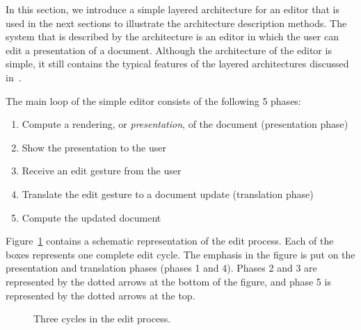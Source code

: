 In this section, we introduce a simple layered architecture for an editor that is used in the next sections to illustrate the architecture description methods. The system that is described by the architecture is an editor in which the user can edit a presentation of a document. Although the architecture of the editor is simple, it still contains the typical features of the layered architectures discussed in~\cite{architecture}. 


The main loop of the simple editor consists of the following 5 phases: 
 \begin{enumerate}
 \item Compute a rendering, or {\it presentation}, of the document   (presentation phase)
 \item Show the presentation to the user
 \item Receive an edit gesture from the user
 \item Translate the edit gesture to a document update (translation   phase)
 \item Compute the updated document
 \end{enumerate}

Figure~\ref{simpleeditprocess} contains a schematic representation of the edit process. Each of the boxes represents one complete edit cycle. The emphasis in the figure is put on the presentation and translation phases (phases 1 and 4). Phases 2 and 3 are represented by the dotted arrows at the bottom of the figure, and phase 5 is represented by the dotted arrows at the top.

\begin{figure}
\begin{small}
\begin{center}
\begin{center}
\begin{scriptsize}
\end{scriptsize}
\end{center}\caption{Three cycles in the edit process.}\label{simpleeditprocess} 
\end{center}
\end{small}
\end{figure}


